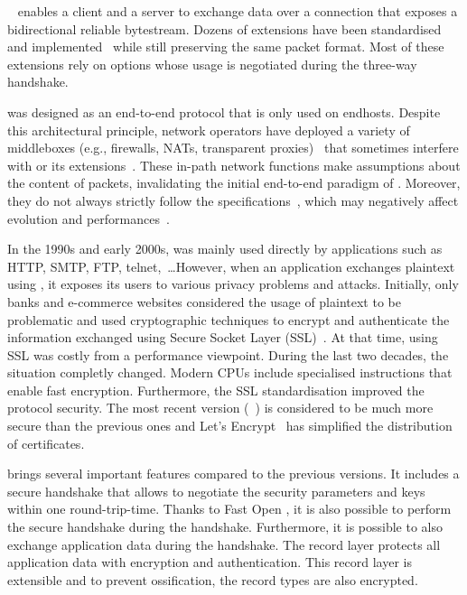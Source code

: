 
\tcp~\cite{rfc793} enables a client and a server to exchange data
over a connection that exposes a bidirectional reliable bytestream.
Dozens of \tcp extensions have been standardised and implemented~\cite{RFC7414}
while still preserving the same packet format. Most of these extensions rely on
\tcp options whose usage is negotiated during the three-way handshake.

\tcp was designed as an end-to-end protocol that is only used on endhosts.
Despite this architectural principle, network operators have deployed a variety
of middleboxes (e.g., firewalls, NATs, transparent proxies)~\cite{mCloud} that
sometimes interfere with \tcp or its extensions~\cite{medina2004measuring,
honda2011still, edeline2019bottom}. These in-path network functions make
assumptions about the content of \tcp packets, invalidating the initial
end-to-end paradigm of \tcp. Moreover, they do not always strictly follow the
\tcp specifications~\cite{honda2011still, hesmans2013tcp}, which may negatively
affect \tcp evolution and performances~\cite{edeline2020evaluating}.


In the 1990s and early 2000s, \tcp was mainly used directly by applications such
as HTTP, SMTP, FTP, telnet,~\ldots However, when an application exchanges
plaintext using \tcp, it exposes its users to various privacy problems and
attacks. Initially, only banks and e-commerce websites considered the usage of
plaintext to be problematic and used cryptographic techniques to encrypt and
authenticate the information exchanged using Secure Socket Layer
(SSL)~\cite{draft-hickman-netscape-ssl}. At that time, using SSL was costly from
a performance viewpoint. During the last two decades, the situation completly
changed. Modern CPUs include specialised instructions that enable fast
encryption. Furthermore, the SSL standardisation improved the protocol security.
The most recent version (~\cite{rfc8446}) is considered to be much more
secure than the previous ones and Let's Encrypt~\cite{aas2019let} has
simplified the distribution of certificates.

 brings several important features compared to the previous versions. It
includes a secure handshake that allows to negotiate the security parameters and
keys within one round-trip-time. Thanks to \tcp Fast Open
\cite{radhakrishnan2011tcp}, it is also possible to perform the secure handshake
during the \tcp handshake. Furthermore, it is possible to also exchange
application data during the handshake. The  record layer protects all
application data with encryption and authentication. This record layer is
extensible and to prevent ossification, the \tls record types are also
encrypted.

